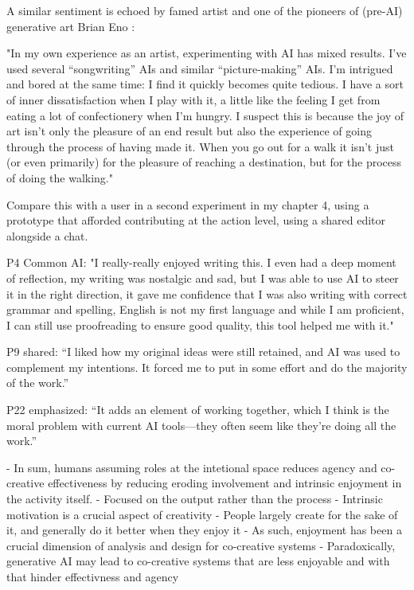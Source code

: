 A similar sentiment is echoed by famed artist and one of the pioneers of (pre-AI) generative art Brian Eno : 

"In my own experience as an artist, experimenting with AI has mixed results. I’ve used several “songwriting” AIs and similar “picture-making” AIs. I’m intrigued and bored at the same time: I find it quickly becomes quite tedious. I have a sort of inner dissatisfaction when I play with it, a little like the feeling I get from eating a lot of confectionery when I’m hungry. I suspect this is because the joy of art isn’t only the pleasure of an end result but also the experience of going through the process of having made it. When you go out for a walk it isn’t just (or even primarily) for the pleasure of reaching a destination, but for the process of doing the walking."
\cite{Eno2024-rj}

Compare this with a user in a second experiment in my chapter 4, using a prototype that afforded contributing at the action level, using a shared editor alongside a chat. 

P4 Common AI: "I really-really enjoyed writing this. I even had a deep moment of reflection, my writing was nostalgic and sad, but I was able to use AI to steer it in the right direction, it gave me confidence that I was also writing with correct grammar and spelling, English is not my first language and while I am proficient, I can still use proofreading to ensure good quality, this tool helped me with it."


P9 shared: “I liked how my original ideas were still retained, and AI was used to complement my intentions. It forced
me to put in some effort and do the majority of the work.”

P22 emphasized: “It adds an element of working together, which I think is the moral problem with current AI tools—they
often seem like they’re doing all the work.”

- In sum, humans assuming roles at the intetional space reduces agency and co-creative effectiveness by reducing eroding involvement and intrinsic enjoyment in the activity itself. 
- Focused on the output rather than the process
- Intrinsic motivation is a crucial aspect of creativity
- People largely create for the sake of it, and generally do it better when they enjoy it \cite{Amabile1996-pt, Csikszentmihalyi1997-ui}
- As such, enjoyment has been a crucial dimension of analysis and design for co-creative systems \cite{Davis2016-te, Cherry2014-ty, Rezwana2022-ui, Clark2018-yf, Lawton2023-gd, Yuan2022-kb, Li2024-yh, Kantosalo2015-pk, Resnick2005-fs}
- Paradoxically, generative AI may lead to co-creative systems that are less enjoyable and with that hinder effectivness and agency

